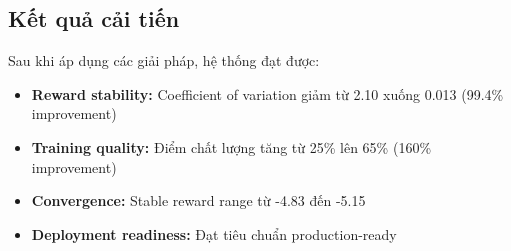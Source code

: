 \subsection{Kết quả cải tiến}
Sau khi áp dụng các giải pháp, hệ thống đạt được:
\begin{itemize}
    \item \textbf{Reward stability:} Coefficient of variation giảm từ 2.10 xuống
        0.013 (99.4\% improvement)

    \item \textbf{Training quality:} Điểm chất lượng tăng từ 25\% lên 65\% (160\%
        improvement)

    \item \textbf{Convergence:} Stable reward range từ -4.83 đến -5.15

    \item \textbf{Deployment readiness:} Đạt tiêu chuẩn production-ready
\end{itemize}